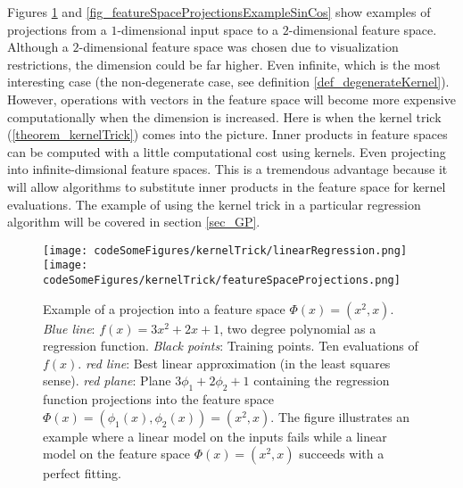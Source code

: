 Figures \ref{fig_featureSpaceProjectionsExample} and \ref{fig_featureSpaceProjectionsExampleSinCos} show examples of projections from a $1$\hyp{}dimensional input space to a $2$\hyp{}dimensional feature space. Although a $2$\hyp{}dimensional feature space was chosen due to visualization restrictions, the dimension could be far higher. Even infinite, which is the most interesting case (the non-degenerate case, see definition \ref{def_degenerateKernel}). However, operations with vectors in the feature space will become more expensive computationally when the dimension is increased. Here is when the kernel trick (\ref{theorem_kernelTrick}) comes into the picture. Inner products in feature spaces can be computed with a little computational cost using kernels. Even projecting into infinite\hyp{}dimsional feature spaces. This is a tremendous advantage because it will allow algorithms to substitute inner products in the feature space for kernel evaluations. The example of using the kernel trick in a particular regression algorithm will be covered in section \ref{sec_GP}.

\begin{figure}[!htbp]
  \centering
    \texttt{[image: codeSomeFigures/kernelTrick/linearRegression.png]}
    \texttt{[image: codeSomeFigures/kernelTrick/featureSpaceProjections.png]}
  \caption[Example of a projection into a feature space $\Phi(x) = (x^2,x)$.]%
{Example of a projection into a feature space $\Phi(x) = (x^2,x)$. 
  \emph{Blue line}: $f(x) = 3x^2+2x+1$, two degree polynomial as a regression function. 
  \emph{Black points}: Training points. Ten evaluations of $f(x)$. 
  \emph{red line}: Best linear approximation (in the least squares sense). 
  \emph{red plane}: Plane $3\phi_1+2\phi_2+1$ containing the regression function projections into the feature space $\Phi(x) = (\phi_1(x),\phi_2(x)) = (x^2,x)$.
  The figure illustrates an example where a linear model on the inputs fails while a linear model on the feature space $\Phi(x) = (x^2,x)$ succeeds with a perfect fitting.} 
  \label{fig_featureSpaceProjectionsExample}
\end{figure}

